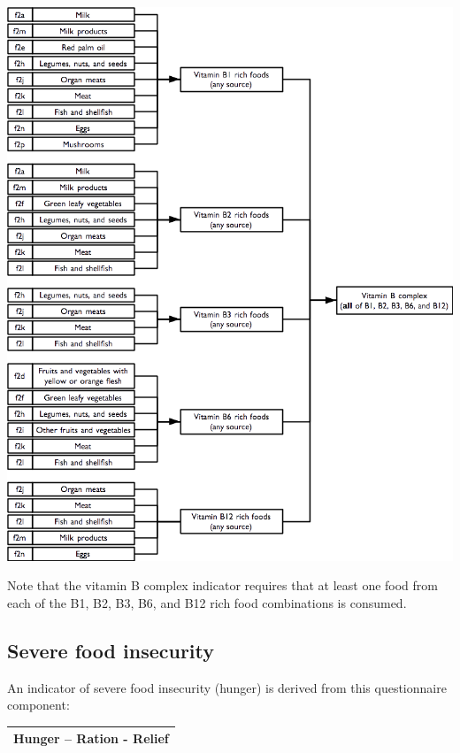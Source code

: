 \documentclass[12pt,a4paper]{book}
\theoremstyle{definition}
\theoremstyle{definition}
\theoremstyle{definition}
\theoremstyle{remark}
\begin{document}
\begin{center}\includegraphics[width=800pt]{figures/indicators14} \end{center}

Note that the vitamin B complex indicator requires that at least one
food from each of the B1, B2, B3, B6, and B12 rich food combinations is
consumed.

\hypertarget{severe-food-insecurity}{%
\subsection{Severe food insecurity}\label{severe-food-insecurity}}

An indicator of severe food insecurity (hunger) is derived from this
questionnaire component:

\begin{longtable}[]{@{}c@{}}
\toprule
\begin{minipage}[t]{0.97\columnwidth}\centering
\textbf{Hunger -- Ration - Relief}\strut
\end{minipage}\tabularnewline
\bottomrule
\end{longtable}
\end{document}
